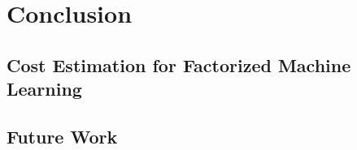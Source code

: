 
\chapter{Conclusion}

\label{chapter:conclusion}

\section{Cost Estimation for Factorized Machine Learning}

\section{Future Work}